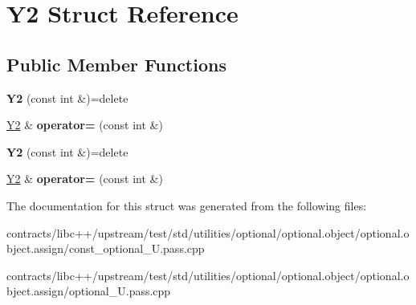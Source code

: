 \hypertarget{struct_y2}{}\section{Y2 Struct Reference}
\label{struct_y2}
\subsection*{Public Member Functions}
\begin{DoxyCompactItemize}
\item 
\mbox{\label{struct_y2_a5ccdeeccfc3c45f556ecb377783439d1}} 
{\bfseries Y2} (const int \&)=delete
\item 
\mbox{\label{struct_y2_a792b5d01f69beb4a9c0c09b341fcc68c}} 
\mbox{\hyperlink{struct_y2}{Y2}} \& {\bfseries operator=} (const int \&)
\item 
\mbox{\label{struct_y2_a5ccdeeccfc3c45f556ecb377783439d1}} 
{\bfseries Y2} (const int \&)=delete
\item 
\mbox{\label{struct_y2_a792b5d01f69beb4a9c0c09b341fcc68c}} 
\mbox{\hyperlink{struct_y2}{Y2}} \& {\bfseries operator=} (const int \&)
\end{DoxyCompactItemize}


The documentation for this struct was generated from the following files\+:\begin{DoxyCompactItemize}
\item 
contracts/libc++/upstream/test/std/utilities/optional/optional.\+object/optional.\+object.\+assign/const\+\_\+optional\+\_\+\+U.\+pass.\+cpp\item 
contracts/libc++/upstream/test/std/utilities/optional/optional.\+object/optional.\+object.\+assign/optional\+\_\+\+U.\+pass.\+cpp\end{DoxyCompactItemize}
